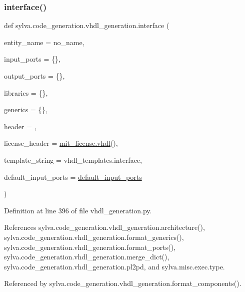 \subsubsection{\texorpdfstring{interface()}{interface()}}
{\footnotesize\ttfamily def sylva.\+code\+\_\+generation.\+vhdl\+\_\+generation.\+interface (\begin{DoxyParamCaption}\item[{}]{entity\+\_\+name = {\ttfamily \textquotesingle{}no\+\_\+name\textquotesingle{}},  }\item[{}]{input\+\_\+ports = {\ttfamily \{\}},  }\item[{}]{output\+\_\+ports = {\ttfamily \{\}},  }\item[{}]{libraries = {\ttfamily \{\}},  }\item[{}]{generics = {\ttfamily \{\}},  }\item[{}]{header = {\ttfamily \textquotesingle{}\textquotesingle{}},  }\item[{}]{license\+\_\+header = {\ttfamily \hyperlink{namespacesylva_1_1code__generation_1_1mit__license_a5c8d9ae3b2d4db392cdc66e37b035675}{mit\+\_\+license.\+vhdl}()},  }\item[{}]{template\+\_\+string = {\ttfamily vhdl\+\_\+templates.interface},  }\item[{}]{default\+\_\+input\+\_\+ports = {\ttfamily \hyperlink{namespacesylva_1_1code__generation_1_1vhdl__generation_a0cf71880063e2c29029ca74b630eec28}{default\+\_\+input\+\_\+ports}} }\end{DoxyParamCaption})}



Definition at line 396 of file vhdl\+\_\+generation.\+py.



References sylva.\+code\+\_\+generation.\+vhdl\+\_\+generation.\+architecture(), sylva.\+code\+\_\+generation.\+vhdl\+\_\+generation.\+format\+\_\+generics(), sylva.\+code\+\_\+generation.\+vhdl\+\_\+generation.\+format\+\_\+ports(), sylva.\+code\+\_\+generation.\+vhdl\+\_\+generation.\+merge\+\_\+dict(), sylva.\+code\+\_\+generation.\+vhdl\+\_\+generation.\+pl2pd, and sylva.\+misc.\+exec.\+type.



Referenced by sylva.\+code\+\_\+generation.\+vhdl\+\_\+generation.\+format\+\_\+components().


